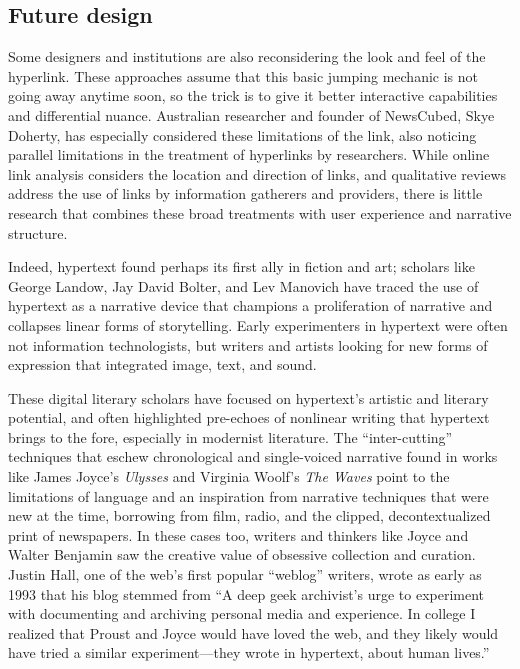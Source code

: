 \subsection{Future design}

Some designers and institutions are also reconsidering the look and feel of the hyperlink. These approaches assume that this basic jumping mechanic is not going away anytime soon, so the trick is to give it better interactive capabilities and differential nuance. Australian researcher and founder of NewsCubed, Skye Doherty, has especially considered these limitations of the link, also noticing parallel limitations in the treatment of hyperlinks by researchers. While online link analysis considers the location and direction of links, and qualitative reviews address the use of links by information gatherers and providers, there is little research that combines these broad treatments with user experience and narrative structure.

Indeed, hypertext found perhaps its first ally in fiction and art; scholars like George Landow, Jay David Bolter, and Lev Manovich have traced the use of hypertext as a narrative device that champions a proliferation of narrative and collapses linear forms of storytelling.\autocite{landow, bolter, manovich} Early experimenters in hypertext were often not information technologists, but writers and artists looking for new forms of expression that integrated image, text, and sound.

These digital literary scholars have focused on hypertext's artistic and literary potential, and often highlighted pre-echoes of nonlinear writing that hypertext brings to the fore, especially in modernist literature. The ``inter-cutting'' techniques that eschew chronological and single-voiced narrative found in works like James Joyce's \emph{Ulysses} and Virginia Woolf's \emph{The Waves} point to the limitations of language and an inspiration from narrative techniques that were new at the time, borrowing from film, radio, and the clipped, decontextualized print of newspapers. In these cases too, writers and thinkers like Joyce and Walter Benjamin saw the creative value of obsessive collection and curation. Justin Hall, one of the web's first popular ``weblog'' writers, wrote as early as 1993 that his blog stemmed from ``A deep geek archivist's urge to experiment with documenting and archiving personal media and experience. In college I realized that Proust and Joyce would have loved the web, and they likely would have tried a similar experiment---they wrote in hypertext, about human lives.''\autocite{gillmor_we_2003?}

